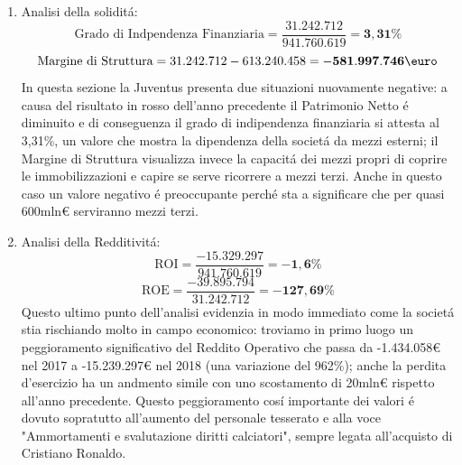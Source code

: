 \documentclass[
    corpo=12pt,
    oneside,
    evenboxes,
    tipotesi=triennale,
    stile=classica,
    oldstyle,
    autoretitolo,
    greek,
]{toptesi}
\begin{document}
\begin{interlinea}{1.5}
\begin{enumerate}
    \item Analisi della solidit\'a:\newline
        \begin{equation}
            \text{Grado di Indpendenza Finanziaria} = \frac{31.242.712}{941.760.619} = \mathbf{3,31\%}
        \label{eqn: indeb_juve}
        \end{equation}
        \begin{equation}
            \text{Margine di Struttura} = 31.242.712-613.240.458 = \mathbf{-581.997.746\mbox{\euro}}
            \label{eqn: marg_strutt_juve}
        \end{equation}
        In questa sezione la Juventus presenta due situazioni nuovamente negative: a causa del risultato in rosso dell'anno
        precedente il Patrimonio Netto \'e diminuito e di conseguenza il grado di indipendenza finanziaria si attesta al 3,31\%,
        un valore che mostra la dipendenza della societ\'a da mezzi esterni; il Margine di Struttura
        visualizza invece la capacit\'a dei mezzi propri di coprire le \linebreak immobilizzazioni e capire se serve ricorrere a mezzi terzi. Anche in questo 
        caso un valore negativo \'e preoccupante perch\'e sta a significare che per quasi 600mln€ serviranno mezzi terzi.\newpage
    \item Analisi della Redditivit\'a:\newline
        \begin{equation}
            \text{ROI} = \frac{-15.329.297}{941.760.619} = \mathbf{-1,6\%}
        \label{eqn: roi_juve}
        \end{equation}
        \begin{equation}
            \text{ROE} = \frac{-39.895.794}{31.242.712} = \mathbf{-127,69\%}
        \label{eqn: roe_juve}
        \end{equation}
        Questo ultimo punto dell'analisi evidenzia in modo immediato come la societ\'a stia rischiando molto in campo economico: troviamo in 
        primo luogo un \linebreak peggioramento significativo del Reddito Operativo che passa da -1.434.058€ nel 2017 a -15.239.297€ nel 2018 (una variazione del 962\%);
        anche la perdita d'esercizio ha un andmento simile con uno scostamento di 20mln€ rispetto all'anno precedente. Questo peggioramento
        cos\'i importante dei valori \'e dovuto sopratutto all'aumento del personale tesserato e alla voce "Ammortamenti e svalutazione diritti calciatori",
        sempre legata all'acquisto di Cristiano Ronaldo.
\end{enumerate}

\end{interlinea}
\end{document}
